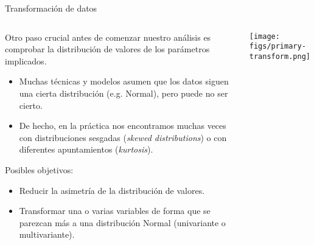 \begin{frame}{Transformación de datos}
 \begin{columns}[T]
    \begin{column}{.75\textwidth}
     \begin{wideitemize}
      \item Otro paso crucial antes de comenzar nuestro análisis es comprobar
      la distribución de valores de los parámetros implicados.
      
      \begin{itemize}
       \item Muchas técnicas y modelos asumen que los datos siguen una cierta
       distribución (e.g. Normal), pero puede no ser cierto.
       
       \item De hecho, en la práctica nos encontramos muchas veces con distribuciones
       sesgadas (\textit{skewed distributions}) o con diferentes apuntamientos
       (\textit{kurtosis}).
      \end{itemize}
      
    \item Posibles objetivos:
    \begin{itemize}
     \item Reducir la asimetría de la distribución de valores.
     
     \item Transformar una o varias variables de forma que se parezcan más a una
     distribución Normal (univariante o multivariante).
    \end{itemize}

    \end{wideitemize}
    
    \end{column}
    \begin{column}{.25\textwidth}
    \vspace*{1cm}
    \texttt{[image: figs/primary-transform.png]}
    \end{column}
  \end{columns}

\end{frame}


